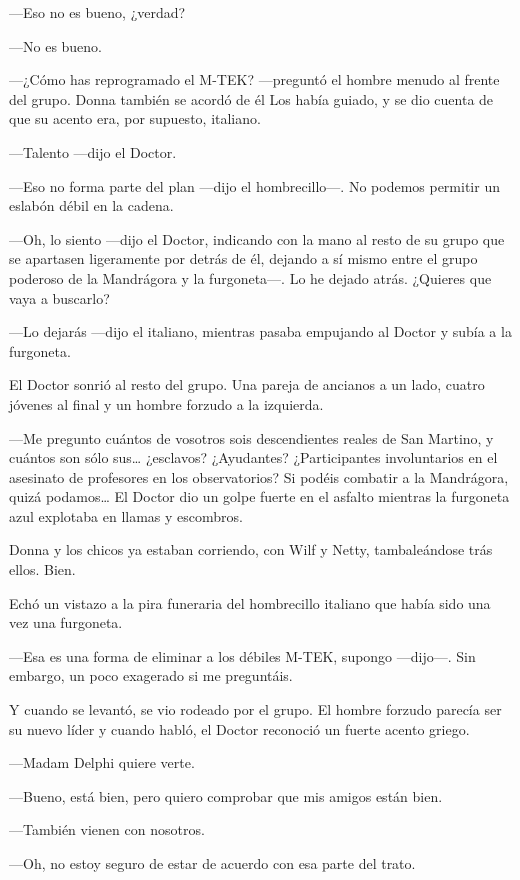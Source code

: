 ---Eso no es bueno, ¿verdad?

---No es bueno.

---¿Cómo has reprogramado el M-TEK? ---preguntó el hombre menudo al
frente del grupo. Donna también se acordó de él Los había guiado, y se
dio cuenta de que su acento era, por supuesto, italiano.

---Talento ---dijo el Doctor.

---Eso no forma parte del plan ---dijo el hombrecillo---. No podemos
permitir un eslabón débil en la cadena.

---Oh, lo siento ---dijo el Doctor, indicando con la mano al resto de su
grupo que se apartasen ligeramente por detrás de él, dejando a sí mismo
entre el grupo poderoso de la Mandrágora y la furgoneta---. Lo he dejado
atrás. ¿Quieres que vaya a buscarlo?

---Lo dejarás ---dijo el italiano, mientras pasaba empujando al Doctor y
subía a la furgoneta.

El Doctor sonrió al resto del grupo. Una pareja de ancianos a un lado,
cuatro jóvenes al final y un hombre forzudo a la izquierda.

---Me pregunto cuántos de vosotros sois descendientes reales de San
Martino, y cuántos son sólo sus\ldots{} ¿esclavos? ¿Ayudantes?
¿Participantes involuntarios en el asesinato de profesores en los
observatorios? Si podéis combatir a la Mandrágora, quizá
podamos\ldots{} El Doctor dio un golpe fuerte en el asfalto mientras la
furgoneta azul explotaba en llamas y escombros.

Donna y los chicos ya estaban corriendo, con Wilf y Netty, tambaleándose
trás ellos. Bien.

Echó un vistazo a la pira funeraria del hombrecillo italiano que había
sido una vez una furgoneta.

---Esa es una forma de eliminar a los débiles M-TEK, supongo ---dijo---.
Sin embargo, un poco exagerado si me preguntáis.

Y cuando se levantó, se vio rodeado por el grupo. El hombre forzudo
parecía ser su nuevo líder y cuando habló, el Doctor reconoció un fuerte
acento griego.

---Madam Delphi quiere verte.

---Bueno, está bien, pero quiero comprobar que mis amigos están bien.

---También vienen con nosotros.

---Oh, no estoy seguro de estar de acuerdo con esa parte del trato.

